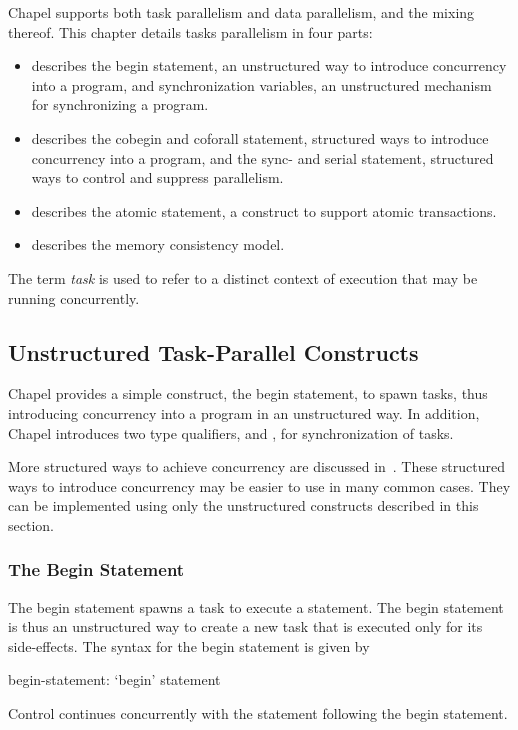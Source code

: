\label{Task_Parallelism_and_Synchronization}

Chapel supports both task parallelism and data parallelism, and the
mixing thereof.  This chapter details tasks parallelism in four parts:
\begin{itemize}
\item {}
describes the begin statement, an unstructured way to introduce
concurrency into a program, and synchronization variables, an
unstructured mechanism for synchronizing a program.
\item {}
describes the cobegin and coforall statement, structured ways to
introduce concurrency into a program, and the sync- and
serial statement, structured ways to control and suppress parallelism.
\item {}
describes the atomic statement, a construct to support atomic
transactions.
\item {}
describes the memory consistency model.
\end{itemize}

The term \emph{task} is used to refer to a distinct context of
execution that may be running concurrently.

\subsection{Unstructured Task-Parallel Constructs}
\label{unstructured_task_parallelism}

Chapel provides a simple construct, the begin statement, to spawn
tasks, thus introducing concurrency into a program in an unstructured
way.  In addition, Chapel introduces two type qualifiers, 
and , for synchronization of tasks.

More structured ways to achieve concurrency are discussed
in~.  These structured ways to
introduce concurrency may be easier to use in many common cases.  They
can be implemented using only the unstructured constructs described in
this section.

\subsubsection{The Begin Statement}
\label{Begin}

The begin statement spawns a task to execute a statement.  The
begin statement is thus an unstructured way to create a new task that
is executed only for its side-effects.  The syntax for the begin
statement is given by
\begin{syntax}
begin-statement:
  `begin' statement
\end{syntax}
Control continues concurrently with the statement following the
begin statement.

